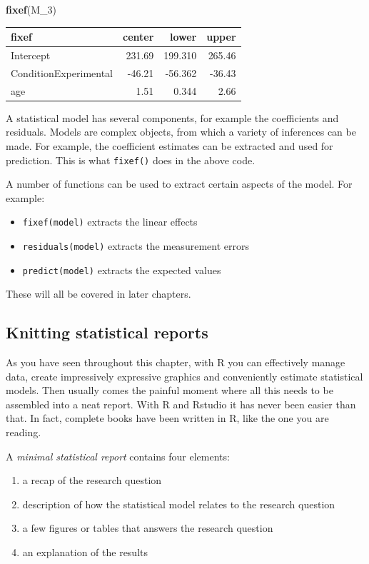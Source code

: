 \documentclass[]{svmono}
\newenvironment{Shaded}{\begin{snugshade}}{\end{snugshade}}
\newcommand{\KeywordTok}[1]{\textcolor[rgb]{0.13,0.29,0.53}{\textbf{#1}}}
\newcommand{\DecValTok}[1]{\textcolor[rgb]{0.00,0.00,0.81}{#1}}
\newcommand{\NormalTok}[1]{#1}
\providecommand{\tightlist}{%
  \setlength{\itemsep}{0pt}\setlength{\parskip}{0pt}}
\theoremstyle{definition}
\theoremstyle{definition}
\theoremstyle{definition}
\theoremstyle{remark}
\begin{document}
\begin{Shaded}
\begin{Highlighting}[]
\KeywordTok{fixef}\NormalTok{(M_}\DecValTok{3}\NormalTok{)}
\end{Highlighting}
\end{Shaded}

\begin{longtable}[]{@{}lrrr@{}}
\toprule
fixef & center & lower & upper\tabularnewline
\midrule
\endhead
Intercept & 231.69 & 199.310 & 265.46\tabularnewline
ConditionExperimental & -46.21 & -56.362 & -36.43\tabularnewline
age & 1.51 & 0.344 & 2.66\tabularnewline
\bottomrule
\end{longtable}

A statistical model has several components, for example the coefficients
and residuals. Models are complex objects, from which a variety of
inferences can be made. For example, the coefficient estimates can be
extracted and used for prediction. This is what \texttt{fixef()} does in
the above code.

A number of functions can be used to extract certain aspects of the
model. For example:

\begin{itemize}
\tightlist
\item
  \texttt{fixef(model)} extracts the linear effects
\item
  \texttt{residuals(model)} extracts the measurement errors
\item
  \texttt{predict(model)} extracts the expected values
\end{itemize}

These will all be covered in later chapters.

\subsection{Knitting statistical
reports}\label{knitting-statistical-reports}

As you have seen throughout this chapter, with R you can effectively
manage data, create impressively expressive graphics and conveniently
estimate statistical models. Then usually comes the painful moment where
all this needs to be assembled into a neat report. With R and Rstudio it
has never been easier than that. In fact, complete books have been
written in R, like the one you are reading.

A \emph{minimal statistical report} contains four elements:

\begin{enumerate}
\def\labelenumi{\arabic{enumi}.}
\tightlist
\item
  a recap of the research question
\item
  description of how the statistical model relates to the research
  question
\item
  a few figures or tables that answers the research question
\item
  an explanation of the results
\end{enumerate}
\end{document}
